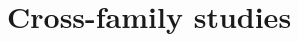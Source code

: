 \documentclass[output=short         
	        ,collection  
	        ,collectionchapter
	        ,collectiontoclongg
 	        ,modfonts,nonflat  
		  ]{langsci/langscibook}                               %
\begin{document}
\part{Cross-family studies}




\end{document}
